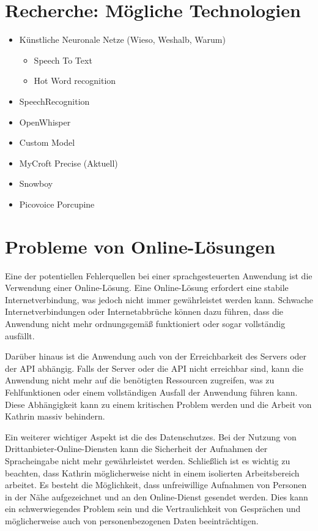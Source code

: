 \section{Recherche: Mögliche Technologien}

\begin{itemize}
    \item Künstliche Neuronale Netze (Wieso, Weshalb, Warum)
    \begin{itemize}
        \item Speech To Text
        \item Hot Word recognition
    \end{itemize}
    \item SpeechRecognition
    \item OpenWhisper
    \item Custom Model
    \item MyCroft Precise (Aktuell)
    \item Snowboy
    \item Picovoice Porcupine
\end{itemize}

\section{Probleme von Online-Lösungen}

Eine der potentiellen Fehlerquellen bei einer sprachgesteuerten Anwendung ist die Verwendung einer Online-Lösung. Eine Online-Lösung erfordert eine stabile Internetverbindung, was jedoch nicht immer gewährleistet werden kann. Schwache Internetverbindungen oder Internetabbrüche können dazu führen, dass die Anwendung nicht mehr ordnungsgemäß funktioniert oder sogar vollständig ausfällt.

Darüber hinaus ist die Anwendung auch von der Erreichbarkeit des Servers oder der API abhängig. Falls der Server oder die API nicht erreichbar sind, kann die Anwendung nicht mehr auf die benötigten Ressourcen zugreifen, was zu Fehlfunktionen oder einem vollständigen Ausfall der Anwendung führen kann. Diese Abhängigkeit kann zu einem kritischen Problem werden und die Arbeit von Kathrin massiv behindern.

Ein weiterer wichtiger Aspekt ist die des Datenschutzes. Bei der Nutzung von Drittanbieter-Online-Diensten kann die Sicherheit der Aufnahmen der Spracheingabe nicht mehr gewährleistet werden. Schließlich ist es wichtig zu beachten, dass Kathrin möglicherweise nicht in einem isolierten Arbeitsbereich arbeitet. Es besteht die Möglichkeit, dass unfreiwillige Aufnahmen von Personen in der Nähe aufgezeichnet und an den Online-Dienst gesendet werden. Dies kann ein schwerwiegendes Problem sein und die Vertraulichkeit von Gesprächen und möglicherweise auch von personenbezogenen Daten beeinträchtigen.

